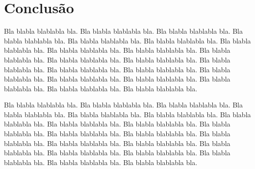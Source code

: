 \documentclass[tese,capa]{texufpel}
\begin{document}
\chapter{Conclusão}

Bla blabla blablabla bla.  Bla blabla blablabla bla.  Bla blabla
blablabla bla.  Bla blabla blablabla bla.  Bla blabla blablabla bla.
Bla blabla blablabla bla.  Bla blabla blablabla bla.  Bla blabla
blablabla bla.  Bla blabla blablabla bla.  Bla blabla blablabla bla.
Bla blabla blablabla bla.  Bla blabla blablabla bla.  Bla blabla
blablabla bla.  Bla blabla blablabla bla.  Bla blabla blablabla bla.
Bla blabla blablabla bla.  Bla blabla blablabla bla.  Bla blabla
blablabla bla.  Bla blabla blablabla bla.  Bla blabla blablabla bla.
Bla blabla blablabla bla.

Bla blabla blablabla bla.  Bla blabla blablabla bla.  Bla blabla
blablabla bla.  Bla blabla blablabla bla.  Bla blabla blablabla bla.
Bla blabla blablabla bla.  Bla blabla blablabla bla.  Bla blabla
blablabla bla.  Bla blabla blablabla bla.  Bla blabla blablabla bla.
Bla blabla blablabla bla.  Bla blabla blablabla bla.  Bla blabla
blablabla bla.  Bla blabla blablabla bla.  Bla blabla blablabla bla.
Bla blabla blablabla bla.  Bla blabla blablabla bla.  Bla blabla
blablabla bla.  Bla blabla blablabla bla.  Bla blabla blablabla bla.
Bla blabla blablabla bla.



 



\end{document}
